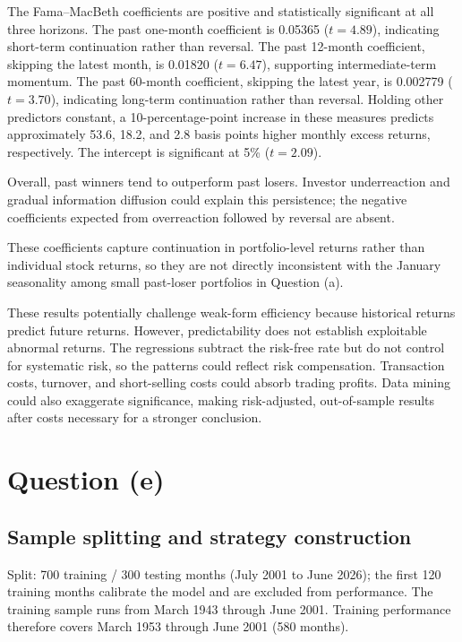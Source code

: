 \documentclass[11pt]{article}
\begin{document}
The Fama--MacBeth coefficients are positive and statistically significant at all
three horizons. The past one-month coefficient is 0.05365 ($t=4.89$), indicating
short-term continuation rather than reversal. The past 12-month coefficient,
skipping the latest month, is 0.01820 ($t=6.47$), supporting intermediate-term
momentum. The past 60-month coefficient, skipping the latest year, is 0.002779
($t=3.70$), indicating long-term continuation rather than reversal. Holding other
predictors constant, a 10-percentage-point increase in these measures predicts
approximately 53.6, 18.2, and 2.8 basis points higher monthly excess returns,
respectively. The intercept is significant at 5\% ($t=2.09$).

Overall, past winners tend to outperform past losers. Investor underreaction and
gradual information diffusion could explain this persistence; the negative
coefficients expected from overreaction followed by reversal are absent.

These coefficients capture continuation in portfolio-level returns rather than individual stock returns, so they are not directly inconsistent with the January seasonality among small past-loser portfolios in Question (a).

These results potentially challenge weak-form efficiency because historical
returns predict future returns. However, predictability does not establish
exploitable abnormal returns. The regressions subtract the risk-free rate but do
not control for systematic risk, so the patterns could reflect risk compensation.
Transaction costs, turnover, and short-selling costs could absorb trading profits.
Data mining could also exaggerate significance, making risk-adjusted,
out-of-sample results after costs necessary for a stronger conclusion.

\clearpage
\section*{Question (e)}

\subsection*{Sample splitting and strategy construction}

Split: 700 training / 300 testing months (July 2001 to June 2026); the first
120 training months calibrate the model and are excluded from performance.
The training sample runs from March 1943 through June 2001. Training performance
therefore covers March 1953 through June 2001 (580 months).
\end{document}
